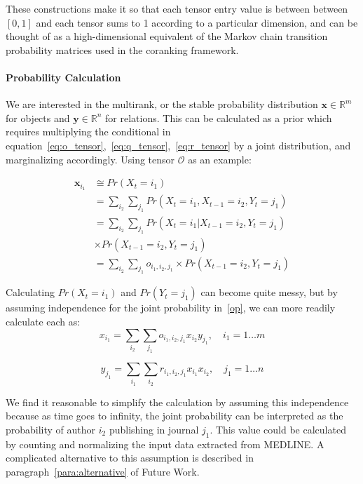 These constructions make it so that each tensor entry value is between between $[0,1]$ and each tensor sums to 1 according to a particular dimension, and can be thought of as a high-dimensional equivalent of the Markov chain transition probability matrices used in the coranking framework.

\paragraph{Probability Calculation}
We are interested in the multirank, or the stable probability distribution $\mathbf{x} \in \mathbb{R}^m$ for objects and $\mathbf{y} \in \mathbb{R}^n$ for relations. This can be calculated as a prior which requires multiplying the conditional in equation~\ref{eq:o_tensor},~\ref{eq:q_tensor},~\ref{eq:r_tensor} by a joint distribution, and marginalizing accordingly. Using tensor $\mathcal{O}$ as an example:

    \begin{align*}
            \mathbf{x}_{i_1} &\cong Pr(X_t=i_1) \\
            &= \sum_{i_2}\sum_{j_1} Pr(X_t=i_1,X_{t-1}=i_2,Y_t=j_1) \\
            &= \sum_{i_2}\sum_{j_1} Pr(X_t=i_1|X_{t-1}=i_2,Y_t=j_1) \\
            &\times Pr(X_{t-1}=i_2,Y_t=j_1) \\
            &= \sum_{i_2}\sum_{j_1} o_{i_1,i_2,j_1} \times Pr(X_{t-1}=i_2,Y_t=j_1) \tag{\theequation}\label{op}
    \end{align*}

Calculating $Pr(X_t=i_1)$ and $Pr(Y_t=j_1)$ can become quite messy, but by assuming independence for the joint probability in~\eqref{op}, we can more readily calculate each as:
    \begin{equation}
        \label{eq:vec_x}
        x_{i_1} = \sum_{i_2}\sum_{j_1} o_{i_1,i_2,j_1} x_{i_2}y_{j_1},      \quad i_1=1 \ldots m
    \end{equation}

    \begin{equation}
        \label{eq:vec_y}
        y_{j_1} = \sum_{i_1}\sum_{i_2} r_{i_1,i_2,j_1} x_{i_1}x_{i_2},      \quad j_1=1 \ldots n
    \end{equation}

We find it reasonable to simplify the calculation by assuming this independence because as time goes to infinity, the joint probability can be interpreted as the probability of author $i_2$ publishing in journal $j_1$. This value could be calculated by counting and normalizing the input data extracted from MEDLINE. A complicated alternative to this assumption is described in paragraph~\ref{para:alternative} of Future Work.

